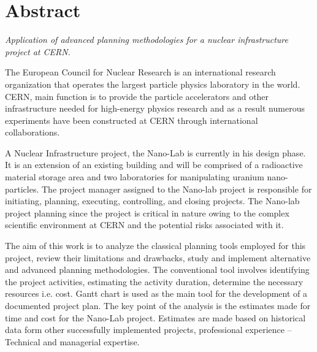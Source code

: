 %
%
%

\chapter*{\huge Abstract}
\begin{SingleSpace}
\emph{Application of advanced planning methodologies for a nuclear infrastructure project at CERN. }
\bigskip


The European Council for Nuclear Research is an international research organization that operates the largest particle physics laboratory in the world. CERN, main function is to provide the particle accelerators and other infrastructure needed for high-energy physics research and as a result numerous experiments have been constructed at CERN through international collaborations. 

A Nuclear Infrastructure project, the Nano-Lab is currently in his design phase. It is an extension of an existing building and will be comprised of a radioactive material storage area and two laboratories for manipulating uranium nano-particles. The project manager assigned to the Nano-lab project is responsible for initiating, planning, executing, controlling, and closing projects. The Nano-lab project planning since the project is critical in nature owing to the complex scientific environment at CERN and the potential risks associated with it.



The aim of this work is to analyze the classical planning tools employed for this project, review their limitations and drawbacks, study and implement alternative and advanced planning methodologies. The conventional tool involves identifying the project activities, estimating the activity duration, determine the necessary resources i.e. cost. Gantt chart is used as the main tool for the development of a documented project plan. The key point of the analysis is the estimates made for time and cost for the Nano-Lab project. Estimates are made based on historical data form other successfully implemented projects, professional experience – Technical and managerial expertise.




\end{SingleSpace}
